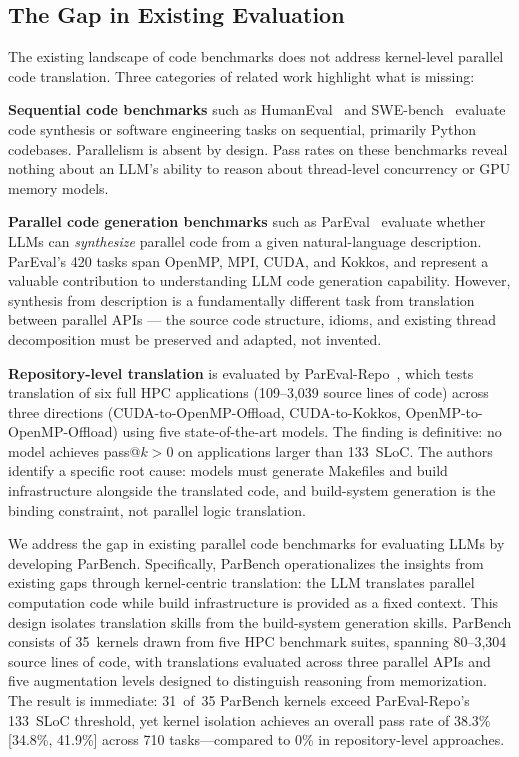 \documentclass[conference]{IEEEtran}
\begin{document}
\subsection{The Gap in Existing Evaluation}
\label{sec:gap}

The existing landscape of code benchmarks does not address kernel-level parallel code translation. Three categories of related work highlight what is missing:

\textbf{Sequential code benchmarks} such as HumanEval~\cite{HumanEval2021} and SWE-bench~\cite{SWEbench2024} evaluate code synthesis or software engineering tasks on sequential, primarily Python codebases. Parallelism is absent by design. Pass rates on these benchmarks reveal nothing about an LLM's ability to reason about thread-level concurrency or GPU memory models.

\textbf{Parallel code generation benchmarks} such as ParEval~\cite{ParEval2024} evaluate whether LLMs can \emph{synthesize} parallel code from a given natural-language description. ParEval's 420 tasks span OpenMP, MPI, CUDA, and Kokkos, and represent a valuable contribution to understanding LLM code generation capability. However, synthesis from description is a fundamentally different task from translation between parallel APIs --- the source code structure, idioms, and existing thread decomposition must be preserved and adapted, not invented.

\textbf{Repository-level translation} is evaluated by ParEval-Repo~\cite{ParEvalRepo2025}, which tests translation of six full HPC applications (109--3,039 source lines of code) across three directions (CUDA-to-OpenMP-Offload, CUDA-to-Kokkos, OpenMP-to-OpenMP-Offload) using five state-of-the-art models. The finding is definitive: no model achieves pass@$k > 0$ on applications larger than 133~SLoC. The authors identify a specific root cause: models must generate Makefiles and build infrastructure alongside the translated code, and build-system generation is the binding constraint, not parallel logic translation.

We address the gap in existing parallel code benchmarks for evaluating LLMs by developing ParBench. Specifically, ParBench operationalizes the insights from existing gaps through kernel-centric translation: the LLM translates parallel computation code while build infrastructure is provided as a fixed context. This design isolates translation skills from the build-system generation skills. ParBench consists of 35~kernels drawn from five HPC benchmark suites, spanning 80--3{,}304 source lines of code, with translations evaluated across three parallel APIs and five augmentation levels designed to distinguish reasoning from memorization. The result is immediate: 31~of~35 ParBench kernels exceed ParEval-Repo's 133~SLoC threshold, yet kernel isolation achieves an overall pass rate of 38.3\% [34.8\%, 41.9\%] across 710 tasks---compared to 0\% in repository-level approaches.
\end{document}
